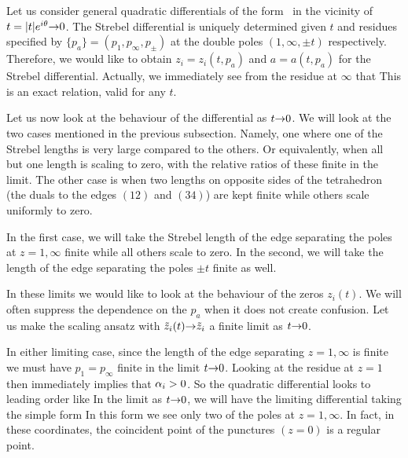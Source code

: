 
Let us consider general quadratic differentials of the form \qd\ in the 
vicinity of $t=|t|e^{i{\theta}}{\rightarrow} 0$. The Strebel differential is uniquely 
determined 
given $t$ and residues specified by $\{p_a\}=(p_1,p_{\infty},p_{\pm})$ at 
the double poles $(1,\infty, \pm t)$ respectively. 
Therefore, we would like to obtain $z_i=z_i(t,p_a)$ and 
$a=a(t,p_a)$ for the Strebel differential. Actually, we immediately see
from the residue at $\infty$ that 
\eqn{} 
This is an exact relation, valid for any $t$. 

Let us now look at the behaviour of the differential as $t{\rightarrow} 0$.
We will look at the two cases mentioned in the previous subsection. Namely, 
one where one of the Strebel lengths is very large compared to the others. 
Or equivalently, when all but one length is scaling to zero, with the relative
ratios of these finite in the limit. 
The other case is when two lengths
on opposite sides of the tetrahedron (the duals to the edges $(12)$ and 
$(34)$) are kept finite while others scale uniformly to zero.

In the first case, we will take the Strebel length of the edge separating 
the poles at $z=1,\infty$ finite while all others scale to zero. 
In the second, we will take the length of the edge separating the poles
$\pm t$ finite as well. 

In these limits we would like to look at the behaviour of the zeros
$z_i(t)$. 
We will often suppress the dependence on 
the $p_a$ when it does not create confusion. Let us make the scaling 
ansatz 
\eqn{}
with $\tilde{z}_i(t){\rightarrow} \tilde{z}_i$ a finite limit as $t{\rightarrow} 0$.

In either limiting case, since the length of the edge
separating $z=1,\infty$ is finite 
we must have $p_1=p_{\infty}$ finite in the 
limit $t{\rightarrow} 0$. Looking at the residue at $z=1$ then 
immediately implies that ${\alpha}_i > 0$. 
So the quadratic differential looks to leading order like 
\eqn{}
In the limit as $t{\rightarrow} 0$, we will have the limiting differential taking
the simple form
\eqn{} 
In this form we see only two of the poles at $z=1, \infty$. In fact, in 
these coordinates, the coincident point of the punctures 
$(z=0)$ is a regular point.  


